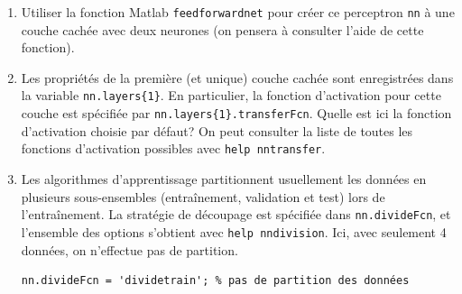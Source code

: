 \begin{enumerate}
\begin{center}
\end{center}
Dans notre cas, $d=2$; donner l'expression formelle de la sortie $y$ en fonction
\begin{itemize}
	\item du vecteur d'entrée $x \eqdef \begin{bmatrix} x_1 & x_2 \end{bmatrix}^\top$;
	\item de la matrice $W \eqdef \begin{bmatrix} w_{11} & w_{12} \\ w_{21} & w_{22} \end{bmatrix}^\top$ et du vecteur $v \eqdef \begin{bmatrix} v_1 & v_2 \end{bmatrix}^\top$ des poids;
	\item du vecteur de biais $b \eqdef \begin{bmatrix} b_1 & b_2 \end{bmatrix}^\top$;
	\item de la fonction d'activation $\sigma$.
\end{itemize}


\item Utiliser la fonction Matlab \texttt{feedforwardnet} pour créer ce perceptron \texttt{nn} à une couche cachée avec deux neurones (on pensera à consulter l'aide de cette fonction).

\item Les propriétés de la première (et unique) couche cachée sont enregistrées dans la variable \texttt{nn.layers\{1\}}. En particulier, la fonction d'activation pour cette couche est spécifiée par \texttt{nn.layers\{1\}.transferFcn}. Quelle est ici la fonction d'activation choisie par défaut? On peut consulter la liste de toutes les fonctions d'activation possibles avec \texttt{help nntransfer}.


\item Les algorithmes d'apprentissage partitionnent usuellement les données en plusieurs sous-ensembles (entraînement, validation et test) lors de l'entraînement. La stratégie de découpage est spécifiée dans \texttt{nn.divideFcn}, et l'ensemble des options s'obtient avec \texttt{help nndivision}. Ici, avec seulement 4 données, on n'effectue pas de partition.
\begin{lstlisting}
nn.divideFcn = 'dividetrain'; % pas de partition des données
\end{lstlisting}


\end{enumerate}
